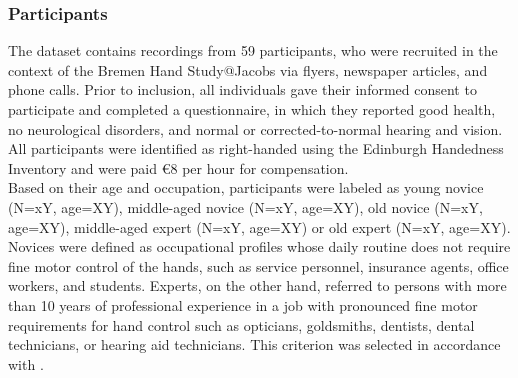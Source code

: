 \subsubsection{Participants}
\label{methods:datasets:I:participants}
The dataset contains recordings from 59 participants, who were recruited in the context of the Bremen Hand Study@Jacobs via flyers, newspaper articles, and phone calls. Prior to inclusion, all individuals gave their informed consent to participate and completed a questionnaire, in which they reported good health, no neurological disorders, and normal or corrected-to-normal hearing and vision. All participants were identified as right-handed using the Edinburgh Handedness Inventory \cite{Oldfield1971} and were paid \euro{8} per hour for compensation.\\
Based on their age and occupation, participants were labeled as young novice (N=xY, age=XY), middle-aged novice (N=xY, age=XY), old novice (N=xY, age=XY), middle-aged expert (N=xY, age=XY) or old expert (N=xY, age=XY). Novices were defined as occupational profiles whose daily routine does not require fine motor control of the hands, such as service personnel, insurance agents, office workers, and students. Experts, on the other hand, referred to persons with more than 10 years of professional experience in a job with pronounced fine motor requirements for hand control such as opticians, goldsmiths, dentists, dental technicians, or hearing aid technicians. This criterion was selected in accordance with \cite{Ericsson1991}. 

